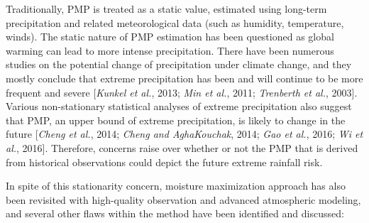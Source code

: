 Traditionally, PMP is treated as a static value, estimated using long-term precipitation and related meteorological data (such as humidity, temperature, winds). The static nature of PMP estimation has been questioned as global warming can lead to more intense precipitation. There have been numerous studies on the potential change of precipitation under climate change, and they mostly conclude that extreme precipitation has been and will continue to be more frequent and severe [\textit{Kunkel et al.}, 2013; \textit{Min et al.}, 2011; \textit{Trenberth et al.}, 2003]. Various non-stationary statistical analyses of extreme precipitation also suggest that PMP, an upper bound of extreme precipitation, is likely to change in the future [\textit{Cheng et al.}, 2014; \textit{Cheng and AghaKouchak}, 2014; \textit{Gao et al.}, 2016; \textit{Wi et al.}, 2016]. Therefore, concerns raise over whether or not the PMP that is derived from historical observations could depict the future extreme rainfall risk.
 
In spite of this stationarity concern, moisture maximization approach has also been revisited with high-quality observation and advanced atmospheric modeling, and several other flaws within the method have been identified and discussed:

